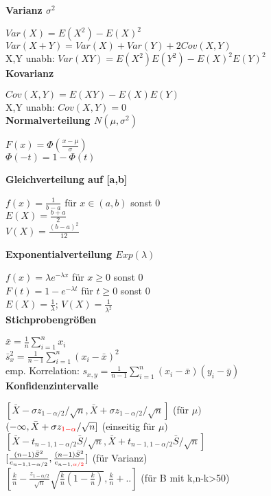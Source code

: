 \documentclass[10pt,twocolumn,a4paper]{article}
\begin{document}
\begin{flushleft}
\textbf{Varianz $\sigma^2$}

$Var(X) = E(X^2) - E(X)^2$\\
$Var(X+Y) = Var(X) + Var(Y) + 2 Cov(X,Y)$\\
X,Y unabh: $Var(XY) = E(X^2)E(Y^2) - E(X)^2E(Y)^2$\\

\textbf{Kovarianz}

$Cov(X, Y) = E(XY) - E(X)E(Y)$\\
X,Y unabh: $Cov(X,Y) = 0$\\

\textbf{Normalverteilung $N(\mu, \sigma^2)$}

$F(x) = \Phi(\frac{x-\mu}{\sigma})$\\
$\Phi(-t) = 1-\Phi(t)$

\textbf{Gleichverteilung auf [a,b]}

$f(x) = \frac{1}{b-a}$ für $x \in (a,b)$ sonst 0\\
$E(X) = \frac{b+a}{2}$\\
$V(X) = \frac{(b-a)^2}{12}$

\textbf{Exponentialverteilung $Exp(\lambda)$}

$f(x) = \lambda e^{-\lambda x}$ für $x \geq 0$ sonst 0\\
$F(t) = 1-e^{-\lambda t}$ für $t \geq 0$ sonst 0\\
$E(X) = \frac{1}{\lambda}$; $V(X) = \frac{1}{\lambda^2}$\\

\textbf{Stichprobengrößen}

$\bar{x} = \frac{1}{n} \sum_{i=1}^{n}x_i$\\
$\bar{s}_x^2 = \frac{1}{n-1} \sum_{i=1}^{n}(x_i-\bar{x})^2$\\
emp. Korrelation: $s_{x,y} = \frac{1}{n-1} \sum_{i=1}^{n}(x_i-\bar{x})(y_i-\bar{y})$\\

\textbf{Konfidenzintervalle}

$[\bar{X}-\sigma z_{1-\alpha/2}/\sqrt{n}, \bar{X}+\sigma z_{1-\alpha/2}/\sqrt{n}]$ (für $\mu)$\\
$(-\infty, \bar{X}+\sigma z_{\textcolor{red}{1-\alpha}}/\sqrt{n}]$ (einseitig für $\mu)$\\
$[\bar{X} - t_{n-1,1-\alpha/2}\bar{S}/\sqrt{n}, \bar{X} + t_{n-1,1-\alpha/2}\bar{S}/\sqrt{n}]$\\
$[\frac{(n-1)\bar{S}^2}{c_{n-1,1-\alpha/2}},\frac{(n-1)\bar{S}^2}{c_{n-1,\textcolor{red}{\alpha/2}}}]$ (für Varianz)\\
$[\frac{k}{n}-\frac{z_{1-\alpha/2}}{\sqrt{n}}\sqrt{\frac{k}{n}(1-\frac{k}{n})}, \frac{k}{n}+..]$ (für B mit k,n-k>50)\\


\end{flushleft}
\end{document}
